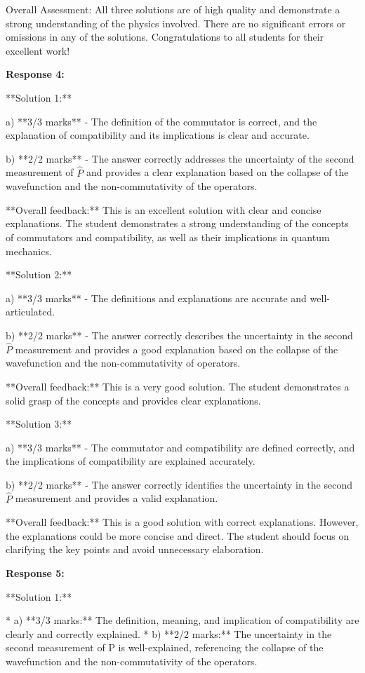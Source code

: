 \documentclass[a4paper,11pt]{article}
\begin{document}
Overall Assessment: All three solutions are of high quality and demonstrate a strong understanding of the physics involved. There are no significant errors or omissions in any of the solutions. Congratulations to all students for their excellent work!

\textbf{Response 4:}

**Solution 1:**

a) **3/3 marks** - The definition of the commutator is correct, and the explanation of compatibility and its implications is clear and accurate.

b) **2/2 marks** - The answer correctly addresses the uncertainty of the second measurement of \( \hat{P} \) and provides a clear explanation based on the collapse of the wavefunction and the non-commutativity of the operators.

**Overall feedback:** This is an excellent solution with clear and concise explanations. The student demonstrates a strong understanding of the concepts of commutators and compatibility, as well as their implications in quantum mechanics.

**Solution 2:**

a) **3/3 marks** - The definitions and explanations are accurate and well-articulated.

b) **2/2 marks** - The answer correctly describes the uncertainty in the second \( \hat{P} \) measurement and provides a good explanation based on the collapse of the wavefunction and the non-commutativity of operators.

**Overall feedback:** This is a very good solution. The student demonstrates a solid grasp of the concepts and provides clear explanations.

**Solution 3:**

a) **3/3 marks** - The commutator and compatibility are defined correctly, and the implications of compatibility are explained accurately.

b) **2/2 marks** - The answer correctly identifies the uncertainty in the second \( \hat{P} \) measurement and provides a valid explanation.

**Overall feedback:** This is a good solution with correct explanations. However, the explanations could be more concise and direct. The student should focus on clarifying the key points and avoid unnecessary elaboration.


\textbf{Response 5:}

**Solution 1:**

* a) **3/3 marks:** The definition, meaning, and implication of compatibility are clearly and correctly explained.
* b) **2/2 marks:** The uncertainty in the second measurement of P is well-explained, referencing the collapse of the wavefunction and the non-commutativity of the operators.
\end{document}
